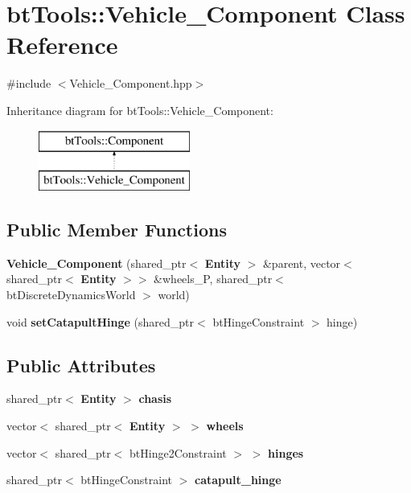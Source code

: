 \section{bt\+Tools\+::Vehicle\+\_\+\+Component Class Reference}
\label{classbt_tools_1_1_vehicle___component}


{\ttfamily \#include $<$Vehicle\+\_\+\+Component.\+hpp$>$}

Inheritance diagram for bt\+Tools\+::Vehicle\+\_\+\+Component\+:\begin{figure}[H]
\begin{center}
\leavevmode
\includegraphics[height=2.000000cm]{classbt_tools_1_1_vehicle___component}
\end{center}
\end{figure}
\subsection*{Public Member Functions}
\begin{DoxyCompactItemize}
\item 
\textbf{ Vehicle\+\_\+\+Component} (shared\+\_\+ptr$<$ \textbf{ Entity} $>$ \&parent, vector$<$ shared\+\_\+ptr$<$ \textbf{ Entity} $>$$>$ \&wheels\+\_\+P, shared\+\_\+ptr$<$ bt\+Discrete\+Dynamics\+World $>$ world)
\item 
void \textbf{ set\+Catapult\+Hinge} (shared\+\_\+ptr$<$ bt\+Hinge\+Constraint $>$ hinge)
\end{DoxyCompactItemize}
\subsection*{Public Attributes}
\begin{DoxyCompactItemize}
\item 
shared\+\_\+ptr$<$ \textbf{ Entity} $>$ \textbf{ chasis}
\item 
vector$<$ shared\+\_\+ptr$<$ \textbf{ Entity} $>$ $>$ \textbf{ wheels}
\item 
vector$<$ shared\+\_\+ptr$<$ bt\+Hinge2\+Constraint $>$ $>$ \textbf{ hinges}
\item 
shared\+\_\+ptr$<$ bt\+Hinge\+Constraint $>$ \textbf{ catapult\+\_\+hinge}
\end{DoxyCompactItemize}


